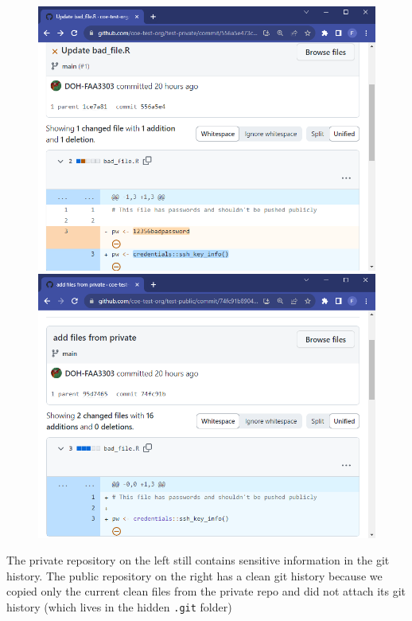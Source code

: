 \documentclass[
  letterpaper,
  DIV=11,
  numbers=noendperiod,
  oneside]{scrartcl}
\begin{document}
\begin{figure}

\begin{minipage}{0.50\linewidth}
\includegraphics{images/private_repo3.PNG}\end{minipage}%
%
\begin{minipage}{0.50\linewidth}
\includegraphics{images/public_repo3.PNG}\end{minipage}%

\end{figure}%

 The private repository on the left still contains
sensitive information in the git history. The public repository on the
right has a clean git history because we copied only the current clean
files from the private repo and did not attach its git history (which
lives in the hidden \texttt{.git} folder)
\end{document}
